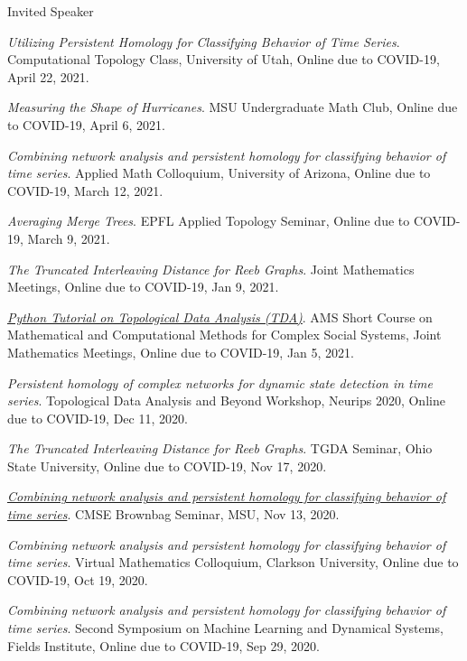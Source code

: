 \documentclass{resume} %
\begin{document}
\begin{rSection}{Invited Speaker}
\begin{etaremune}
\item\emph{Utilizing Persistent Homology for Classifying Behavior of Time Series}. Computational Topology Class, University of Utah, Online due to COVID-19, April 22, 2021. 

\item\emph{Measuring the Shape of Hurricanes}. MSU Undergraduate Math Club, Online due to COVID-19, April 6, 2021. 

\item\emph{Combining network analysis and persistent homology for classifying behavior of time series}. Applied Math Colloquium, University of Arizona, Online due to COVID-19, March 12, 2021. 

\item\emph{Averaging Merge Trees}. EPFL Applied Topology Seminar, Online due to COVID-19, March 9, 2021. 

\item\emph{The Truncated Interleaving Distance for Reeb Graphs}. Joint Mathematics Meetings, Online due to COVID-19, Jan 9, 2021. 

\item\emph{\href{https://github.com/lizliz/TDA-Python-Workshop-JMM21}{Python Tutorial on Topological Data Analysis (TDA)}}. AMS Short Course on Mathematical and Computational Methods for Complex Social Systems, Joint Mathematics Meetings, Online due to COVID-19, Jan 5, 2021. 

\item\emph{Persistent homology of complex networks for dynamic state detection in time series}. Topological Data Analysis and Beyond Workshop, Neurips 2020, Online due to COVID-19, Dec 11, 2020. 

\item\emph{The Truncated Interleaving Distance for Reeb Graphs}. TGDA Seminar, Ohio State University, Online due to COVID-19, Nov 17, 2020. 

\item\emph{\href{https://mediaspace.msu.edu/media/t/1_yghdjfiz}{Combining network analysis and persistent homology for classifying behavior of time series}}. CMSE Brownbag Seminar, MSU, Nov 13, 2020. 

\item\emph{Combining network analysis and persistent homology for classifying behavior of time series}. Virtual Mathematics Colloquium, Clarkson University, Online due to COVID-19, Oct 19, 2020. 

\item\emph{Combining network analysis and persistent homology for classifying behavior of time series}. Second Symposium on Machine Learning and Dynamical Systems, Fields Institute, Online due to COVID-19, Sep 29, 2020. 


\end{etaremune}
\end{rSection}
\end{document}

